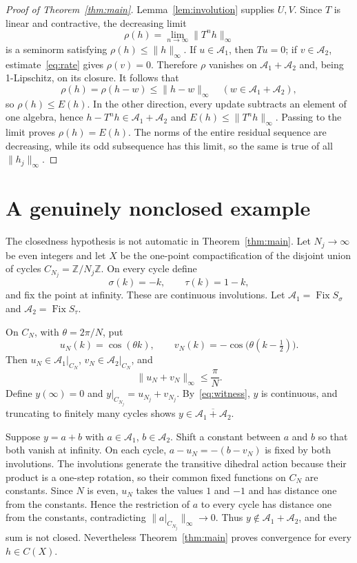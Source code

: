 \documentclass[11pt]{article}
\theoremstyle{remark}
\newcommand{\A}{\mathcal A}
\newcommand{\Fix}{\operatorname{Fix}}
\begin{document}
\begin{proof}[Proof of Theorem~\ref{thm:main}]
Lemma~\ref{lem:involution} supplies $U,V$.  Since $T$ is linear and
contractive, the decreasing limit
\[
 \rho(h)=\lim_{n\to\infty}\|T^nh\|_\infty
\]
is a seminorm satisfying $\rho(h)\le\|h\|_\infty$.  If $u\in\A_1$, then
$Tu=0$; if $v\in\A_2$, estimate~\eqref{eq:rate} gives $\rho(v)=0$.
Therefore $\rho$ vanishes on $\A_1+\A_2$ and, being 1-Lipschitz, on its
closure.  It follows that
\[
 \rho(h)=\rho(h-w)\le\|h-w\|_\infty
 \quad(w\in\A_1+\A_2),
\]
so $\rho(h)\le E(h)$.  In the other direction, every update subtracts an
element of one algebra, hence $h-T^nh\in\A_1+\A_2$ and
$E(h)\le\|T^nh\|_\infty$.  Passing to the limit proves $\rho(h)=E(h)$.
The norms of the entire residual sequence are decreasing, while its odd
subsequence has this limit, so the same is true of all $\|h_j\|_\infty$.
\end{proof}

\section{A genuinely nonclosed example}

The closedness hypothesis is not automatic in Theorem~\ref{thm:main}.
Let $N_j\to\infty$ be even integers and let $X$ be the one-point
compactification of the disjoint union of cycles
$C_{N_j}=\mathbb Z/N_j\mathbb Z$.  On every cycle define
\[
 \sigma(k)=-k,\qquad \tau(k)=1-k,
\]
and fix the point at infinity.  These are continuous involutions.  Let
$\A_1=\Fix S_\sigma$ and $\A_2=\Fix S_\tau$.

On $C_N$, with $\theta=2\pi/N$, put
\[
 u_N(k)=\cos(\theta k),\qquad
 v_N(k)=-\cos\bigl(\theta(k-\tfrac12)\bigr).
\]
Then $u_N\in\A_1|_{C_N}$, $v_N\in\A_2|_{C_N}$, and
\begin{equation}\label{eq:witness}
 \|u_N+v_N\|_\infty\le\frac\pi N.
\end{equation}
Define $y(\infty)=0$ and
$y|_{C_{N_j}}=u_{N_j}+v_{N_j}$.  By~\eqref{eq:witness}, $y$ is continuous,
and truncating to finitely many cycles shows
$y\in\overline{\A_1+\A_2}$.

Suppose $y=a+b$ with $a\in\A_1$, $b\in\A_2$.  Shift a constant between
$a$ and $b$ so that both vanish at infinity.  On each cycle,
$a-u_N=-(b-v_N)$ is fixed by both involutions.  The involutions generate
the transitive dihedral action because their product is a one-step
rotation, so their common fixed functions on $C_N$ are constants.  Since
$N$ is even, $u_N$ takes the values $1$ and $-1$ and has distance one from
the constants.  Hence the restriction of $a$ to every cycle has distance
one from the constants, contradicting $\|a|_{C_{N_j}}\|_\infty\to0$.
Thus $y\notin\A_1+\A_2$, and the sum is not closed.  Nevertheless
Theorem~\ref{thm:main} proves convergence for every $h\in C(X)$.
\end{document}
